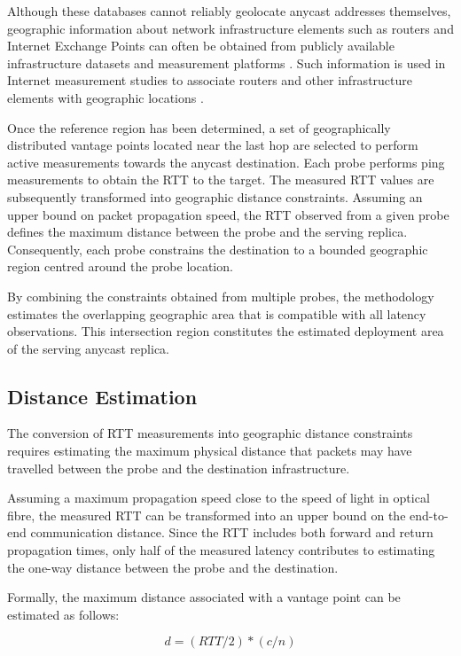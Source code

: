 \documentclass[
A4paper,                %
twoside,                %
openright,              %
chapterprefix=true,     %
12pt,                   %
headings=normal,        %
titlepage=on            %
]{book}
\begin{document}
Although these databases cannot reliably geolocate anycast addresses themselves, geographic information about network infrastructure elements such as routers and Internet Exchange Points can often be obtained from publicly available infrastructure datasets and measurement platforms \cite{RIPEIPmap, Candela2025UsingInfrastructure}. Such information is used in Internet measurement studies to associate routers and other infrastructure elements with geographic locations \cite{CAIDAITK}.

Once the reference region has been determined, a set of geographically distributed vantage points  located near the last hop are selected to perform active measurements towards the anycast destination. Each probe performs ping measurements to obtain the RTT to the target. The measured RTT values are subsequently transformed into geographic distance constraints. Assuming an upper bound on packet propagation speed, the RTT observed from a given probe defines the maximum distance between the probe and the serving replica. Consequently, each probe constrains the destination to a bounded geographic region centred around the probe location.

By combining the constraints obtained from multiple probes, the methodology estimates the overlapping geographic area that is compatible with all latency observations. This intersection region constitutes the estimated deployment area of the serving anycast replica.

\subsection{Distance Estimation}
\label{sc:hunter_multilateration_distance_estimation}

The conversion of RTT measurements into geographic distance constraints requires estimating the maximum physical distance that packets may have travelled between the probe and the destination infrastructure.

Assuming a maximum propagation speed close to the speed of light in optical fibre, the measured RTT can be transformed into an upper bound on the end-to-end communication distance. Since the RTT includes both forward and return propagation times, only half of the measured latency contributes to estimating the one-way distance between the probe and the destination.

Formally, the maximum distance associated with a vantage point can be estimated as follows:

\begin{equation*}
    d = (RTT/2) * (c/n)   
\end{equation*}
\end{document}
